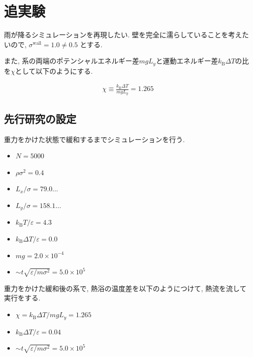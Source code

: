 \documentclass[dvipdfmx]{jsarticle}
\numberwithin{equation}{subsection}
\begin{document}

\newpage

\section{追実験}

雨が降るシミュレーションを再現したい. 壁を完全に濡らしていることを考えたいので, $\sigma^{\text{wall}}=1.0\neq 0.5$ とする.

また, 系の両端のポテンシャルエネルギー差$mgL_y$と運動エネルギー差$k_{\text{B}}\Delta T$の比を$\chi$として以下のようにする.

\begin{align}
  \chi \equiv \frac{k_{\text{B}}\Delta T}{mgL_{y}} = 1.265
\end{align}

\subsection{先行研究の設定}

重力をかけた状態で緩和するまでシミュレーションを行う.

\begin{itemize}
  \item $N = 5000$
  \item $\rho \sigma^2 = 0.4$
  \item $L_x / \sigma = 79.0\dots$
  \item $L_y / \sigma = 158.1\dots$
  \item $k_{\text{B}} T/\varepsilon = 4.3$
  \item $k_{\text{B}} \Delta T/\varepsilon = 0.0$
  \item $mg = 2.0 \times 10^{-4}$
  \item $\sim t \sqrt{\varepsilon / m \sigma^2} = 5.0 \times 10^{5}$
\end{itemize}

重力をかけた緩和後の系で, 熱浴の温度差を以下のようにつけて, 熱流を流して実行をする.

\begin{itemize}
  \item $\chi = k_{\text{B}}\Delta T / mg L_y = 1.265$
  \item $k_{\text{B}} \Delta T/\varepsilon = 0.04$
  \item $\sim t \sqrt{\varepsilon / m \sigma^2} = 5.0 \times 10^{5}$
\end{itemize}
\end{document}
